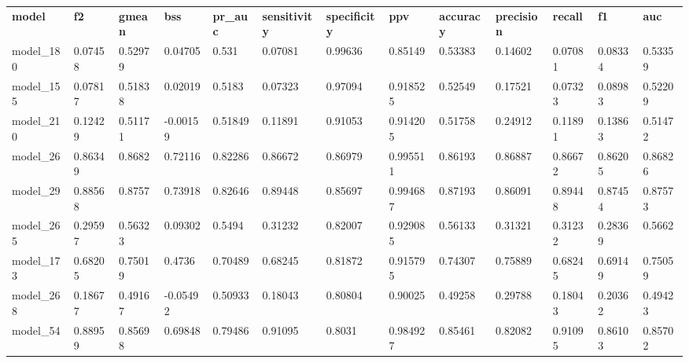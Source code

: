 \begin{tabular}{lllllllllllll}
\textbf{model} & \textbf{f2} & \textbf{gmean} & \textbf{bss} & \textbf{pr\_auc} & \textbf{sensitivity} & \textbf{specificity} & \textbf{ppv} & \textbf{accuracy} & \textbf{precision} & \textbf{recall} & \textbf{f1} & \textbf{auc} \\
model\_180     & 0.07458     & 0.52979        & 0.04705      & 0.531            & 0.07081              & 0.99636              & 0.85149      & 0.53383           & 0.14602            & 0.07081         & 0.08334     & 0.53359      \\
model\_155     & 0.07817     & 0.51838        & 0.02019      & 0.5183           & 0.07323              & 0.97094              & 0.918525     & 0.52549           & 0.17521            & 0.07323         & 0.08983     & 0.52209      \\
model\_210     & 0.12429     & 0.51171        & -0.00159     & 0.51849          & 0.11891              & 0.91053              & 0.914205     & 0.51758           & 0.24912            & 0.11891         & 0.13863     & 0.51472      \\
model\_26      & 0.86349     & 0.8682         & 0.72116      & 0.82286          & 0.86672              & 0.86979              & 0.995511     & 0.86193           & 0.86887            & 0.86672         & 0.86205     & 0.86826      \\
model\_29      & 0.88568     & 0.8757         & 0.73918      & 0.82646          & 0.89448              & 0.85697              & 0.994687     & 0.87193           & 0.86091            & 0.89448         & 0.87454     & 0.87573      \\
model\_265     & 0.29597     & 0.56323        & 0.09302      & 0.5494           & 0.31232              & 0.82007              & 0.929085     & 0.56133           & 0.31321            & 0.31232         & 0.28369     & 0.5662       \\
model\_173     & 0.68205     & 0.75019        & 0.4736       & 0.70489          & 0.68245              & 0.81872              & 0.915795     & 0.74307           & 0.75889            & 0.68245         & 0.69149     & 0.75059      \\
model\_268     & 0.18677     & 0.49167        & -0.05492     & 0.50933          & 0.18043              & 0.80804              & 0.90025      & 0.49258           & 0.29788            & 0.18043         & 0.20362     & 0.49423      \\
model\_54      & 0.88959     & 0.85698        & 0.69848      & 0.79486          & 0.91095              & 0.8031               & 0.984927     & 0.85461           & 0.82082            & 0.91095         & 0.86103     & 0.85702      \\

\end{tabular}
